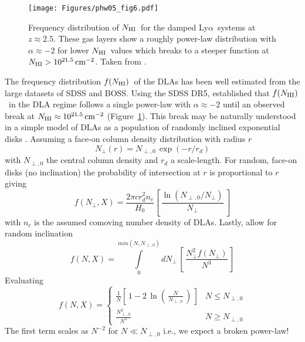 \documentclass[graybox]{svmult}
\def\lya{Ly$\alpha$}
\def\ltk{\left [ \,}
\def\ltp{\left ( \,}
\def\rtk{\, \right  ] }
\def\rtp{\, \right  ) }
\def\intl{\int\limits}
\newcommand{\mnhi}{N_{\rm HI}}
\newcommand{\nhi}{$\mnhi$}
\def\cm#1{\, {\rm cm^{#1}}}
\def\mfnhi{f(\mnhi)}
\def\fnhi{$\mfnhi$}
\begin{document}
%
\begin{figure}[b]
\sidecaption
\texttt{[image: Figures/phw05\_fig6.pdf]}
%
%
\caption{Frequency distribution of \nhi\ for the damped \lya\
systems at $z \approx 2.5$.  These gas layers
show a roughly power-law distribution with $\alpha \approx -2$
for lower \nhi\ values which breaks to a steeper function 
at $\mnhi > 10^{21.5} \cm{-2}$.
Taken from \cite{phw05}.
}
\label{fig:phw05_fN}       %
\end{figure}

The frequency distribution \fnhi\ of the DLAs has been well
estimated from the large datasets of SDSS and BOSS.  Using
the SDSS DR5, \cite{phw05} established that \fnhi\ in the DLA
regime follows a single power-law with $\alpha \approx -2$
until an observed break at $\mnhi \approx 10^{21.5} \cm{-2}$
(Figure~\ref{fig:phw05_fN}).
This break may be naturally understood in a simple model
of DLAs as a population of randomly inclined exponential disks
\cite[]{fall93,wlf+95}.
Assuming a face-on column density distribution with radius $r$
\begin{equation}
N_\perp (r) = N_{\perp,0} \, \exp(-r/r_d)
\end{equation}
with $N_{\perp,0}$ the central column density and $r_d$ a scale-length.
For random, face-on disks (no inclination) the probability
of intersection at $r$ is proportional to $r$ giving
\begin{equation}
f(N_\perp,X) = \frac{2 \pi c r_d^2 n_c}{H_0} \ltk \frac{\ln (N_{\perp,0}/N_\perp)}{N_\perp} \rtk
\end{equation}
with  $n_c$ is the assumed comoving number density of DLAs.
Lastly, allow for random inclination
\begin{equation}
f(N,X) = \intl_0^{min(N,N_{\perp,0})} dN_\perp \, \ltk \frac{N_\perp^2 f(N_\perp)}{N^3} \rtk
\end{equation}
Evaluating 
\begin{equation}
f(N,X) = 
        \begin{cases}
        \frac{1}{N} \ltk 1 - 2 \, \ln \ltp \frac{N}{N_{\perp,0}} \rtp \rtk & N \le N_{\perp, 0} \\
        \frac{N_{\perp,0}^2}{N^3} & N \ge N_{\perp,0}
        \end{cases}
      \end{equation}
The first term scales as $N^{-2}$ for $N \ll N_{\perp,0}$
i.e., we expect a broken power-law!
\end{document}
